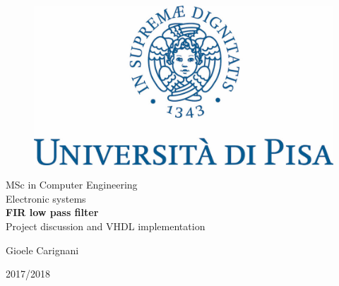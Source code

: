 
\begin{titlepage}

    \begin{figure}
      \centering
      \includegraphics[scale=0.3]{images/cherubino.jpeg}
    \end{figure}

    \begin{center}
      MSc in Computer Engineering\\
      Electronic systems\\
      \vspace*{5\baselineskip}
      \textbf{\large FIR low pass filter}\\
      Project discussion and VHDL implementation
    \end{center}
    \vspace*{7\baselineskip}
    \null\hfill Gioele Carignani

    \begin{center}
        2017/2018
    \end{center}
\end{titlepage}